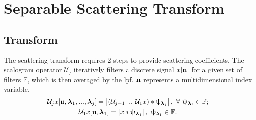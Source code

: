 


\section{Separable Scattering Transform} \label{sec:wst}

\subsection{Transform}

The scattering transform requires 2 steps to provide scattering coefficients. The scalogram operator $\mathcal{U}_j$ iteratively filters a discrete signal $x[\boldsymbol{\mathbf{n}}]$ for a given set of filters $\mathbb{F}$, which is then averaged by the \ac{lpf}. $\boldsymbol{\mathbf{n}}$ represents a multidimensional index variable.
\begin{gather}
    \mathcal{U}_j x [\boldsymbol{\mathbf{n}}, \boldsymbol{\mathbf{\lambda}}_1, ..., \boldsymbol{\mathbf{\lambda}}_j] = \left|\left(\mathcal{U}_{j-1} \ ...\  \mathcal{U}_1 x\right) * \uppsi_{\boldsymbol{\mathbf{\lambda}}_j} \right|, \ \forall \ \uppsi_{\boldsymbol{\mathbf{\lambda}}_j} \in \mathbb{F}; \\
     \mathcal{U}_1 x [\boldsymbol{\mathbf{n}}, \boldsymbol{\mathbf{\lambda}}_1] =  \left| x * \uppsi_{\boldsymbol{\mathbf{\lambda}}_1} \right| , \ \uppsi_{\boldsymbol{\mathbf{\lambda}}_1} \in \mathbb{F}.
\end{gather}

